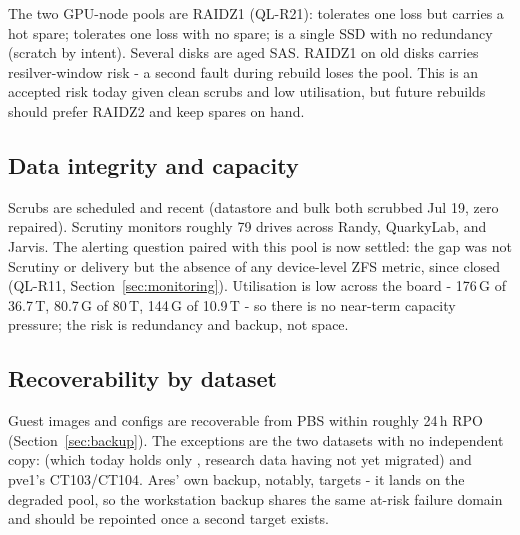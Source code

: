 The two GPU-node pools are RAIDZ1 (QL-R21):  tolerates one loss but carries a
hot spare;  tolerates one loss with no spare;  is a single SSD with
no redundancy (scratch by intent). Several disks are aged SAS. RAIDZ1 on old disks carries
resilver-window risk - a second fault during rebuild loses the pool. This is an accepted risk
today given clean scrubs and low utilisation, but future rebuilds should prefer RAIDZ2 and
keep spares on hand.

\subsection{Data integrity and capacity}

Scrubs are scheduled and recent (datastore and bulk both scrubbed Jul 19, zero repaired).
Scrutiny monitors roughly 79 drives across Randy, QuarkyLab, and Jarvis. The alerting
question paired with this pool is now settled: the gap was not Scrutiny or delivery but the
absence of any device-level ZFS metric, since closed (QL-R11, Section~\ref{sec:monitoring}). Utilisation is low across the board -
 176\,G of 36.7\,T,  80.7\,G of 80\,T,  144\,G of
10.9\,T - so there is no near-term capacity pressure; the risk is redundancy and backup, not
space.

\subsection{Recoverability by dataset}

Guest images and configs are recoverable from PBS within roughly 24\,h RPO (Section~\ref{sec:backup}).
The exceptions are the two datasets with no independent copy:  (which today holds
only , research data having not yet migrated) and pve1's CT103/CT104. Ares' own  backup, notably, targets
 - it lands on the degraded  pool, so the
workstation backup shares the same at-risk failure domain and should be repointed once a
second target exists.
